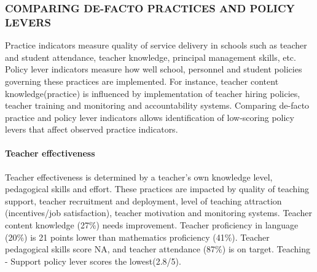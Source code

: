 \documentclass[twocolumn]{article}
\let\oldparagraph\paragraph
\renewcommand{\paragraph}[1]{\oldparagraph{#1}\mbox{}}
\begin{document}
\hypertarget{comparing-de-facto-practices-and-policy-levers}{%
\subsubsection{\texorpdfstring{\textbf{COMPARING DE-FACTO PRACTICES AND
POLICY
LEVERS}}{COMPARING DE-FACTO PRACTICES AND POLICY LEVERS}}\label{comparing-de-facto-practices-and-policy-levers}}

Practice indicators measure quality of service delivery in schools such
as teacher and student attendance, teacher knowledge, principal
management skills, etc. Policy lever indicators measure how well school,
personnel and student policies governing these practices are
implemented. For instance, teacher content knowledge(practice) is
influenced by implementation of teacher hiring policies, teacher
training and monitoring and accountability systems. Comparing de-facto
practice and policy lever indicators allows identification of
low-scoring policy levers that affect observed practice indicators.

\hypertarget{teacher-effectiveness}{%
\paragraph{\texorpdfstring{\textbf{Teacher
effectiveness}}{Teacher effectiveness}}\label{teacher-effectiveness}}

Teacher effectiveness is determined by a teacher's own knowledge level,
pedagogical skills and effort. These practices are impacted by quality
of teaching support, teacher recruitment and deployment, level of
teaching attraction (incentives/job satisfaction), teacher motivation
and monitoring systems. Teacher content knowledge (27\%) needs
improvement. Teacher proficiency in language (20\%) is 21 points lower
than mathematics proficiency (41\%). Teacher pedagogical skills score
NA, and teacher attendance (87\%) is on target. Teaching - Support
policy lever scores the lowest(2.8/5).
\end{document}

